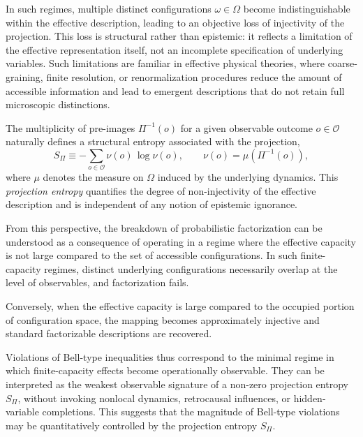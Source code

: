     In such regimes, multiple distinct configurations $\omega \in \Omega$ become
    indistinguishable within the effective description, leading to an objective loss
    of injectivity of the projection.
    This loss is structural rather than epistemic: it reflects a limitation of the
    effective representation itself, not an incomplete specification of underlying variables.
    Such limitations are familiar in effective physical theories, where coarse-graining,
    finite resolution, or renormalization procedures reduce the amount of accessible
    information and lead to emergent descriptions that do not retain full microscopic
    distinctions.

    The multiplicity of pre-images $\Pi^{-1}(o)$ for a given observable outcome
    $o \in \mathcal{O}$ naturally defines a structural entropy associated with the
    projection,
    \[
      S_{\Pi} \equiv -\sum_{o \in \mathcal{O}} \nu(o)\,\log \nu(o),
      \qquad
      \nu(o)=\mu\!\left(\Pi^{-1}(o)\right),
    \]
    where $\mu$ denotes the measure on $\Omega$ induced by the underlying dynamics.
    This \emph{projection entropy} quantifies the degree of non-injectivity of the
    effective description and is independent of any notion of epistemic ignorance.

    From this perspective, the breakdown of probabilistic factorization can be understood
    as a consequence of operating in a regime where the effective capacity is not large
    compared to the set of accessible configurations.
    In such finite-capacity regimes, distinct underlying configurations necessarily
    overlap at the level of observables, and factorization fails.

    Conversely, when the effective capacity is large compared to the occupied portion
    of configuration space, the mapping becomes approximately injective and standard
    factorizable descriptions are recovered.

    Violations of Bell-type inequalities thus correspond to the minimal regime in which
    finite-capacity effects become operationally observable.
    They can be interpreted as the weakest observable signature of a non-zero projection
    entropy $S_{\Pi}$, without invoking nonlocal dynamics, retrocausal influences, or
    hidden-variable completions.
    This suggests that the magnitude of Bell-type violations may be quantitatively
    controlled by the projection entropy $S_{\Pi}$.
